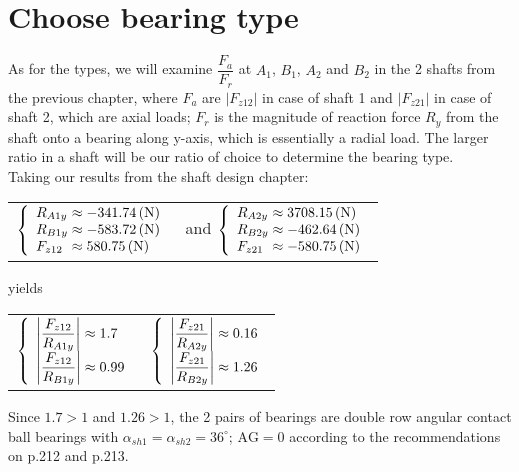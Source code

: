 \section{Choose bearing type}
As for the types, we will examine $  \dfrac{F_a}{F_r}  $ at $ A_1 $, $ B_1 $, $ A_2 $ and $ B_2 $ in the 2 shafts from the previous chapter, where $ F_a $ are $ |F_{z12}| $ in case of shaft 1 and $ |F_{z21}| $ in case of shaft 2, which are axial loads; $ F_r $ is the magnitude of reaction force $ R_y $ from the shaft onto a bearing along y-axis, which is essentially a radial load. The larger ratio in a shaft will be our ratio of choice to determine the bearing type.\\
Taking our results from the shaft design chapter: \vskip2mm
{\centering
	\begin{tabular}[ht]{p{6cm}p{7cm}}
		$
		\left\{ 
		\begin{array}{l@{{} \approx {}}l}
		R_{A1y} & -341.74\unit{(N)}\\
		R_{B1y} & -583.72\unit{(N)}\\
		F_{z12} & 580.75 \unit{(N)}\\
		\end{array}
		\right.
		$ & and \qquad $
		\left\{ 
		\begin{array}{l@{{} \approx {}}l}
		R_{A2y} & 3708.15 \unit{(N)}\\
		R_{B2y} & -462.64 \unit{(N)}\\
		F_{z21} & -580.75 \unit{(N)}\\
		\end{array}
		\right.
		$
\end{tabular}}\vskip2mm
yields\vskip2mm
{\centering
	\begin{tabular}[t]{p{6cm}p{7cm}}
		$
		\left\{ 
		\begin{array}{l@{{} \approx {}}l}
		\left| \dfrac{F_{z12}}{R_{A1y}}\right|  & 1.7 \\
		\left| \dfrac{F_{z12}}{R_{B1y}}\right|  & 0.99 \\
		\end{array}
		\right.$
		& $
		\left\{ 
		\begin{array}{l@{{} \approx {}}l}
		\left| \dfrac{F_{z21}}{R_{A2y}}\right|  & 0.16 \\
		\left| \dfrac{F_{z21}}{R_{B2y}}\right|  & 1.26 \\
		\end{array}
		\right.$
\end{tabular}}\vskip2mm
Since $ 1.7>1 $ and $ 1.26>1 $, the 2 pairs of bearings are double row angular contact ball bearings with $ \alpha_{sh1} = \alpha_{sh2} = 36^\circ $; $ \text{AG} = 0 $ according to the recommendations on p.212 and p.213.


